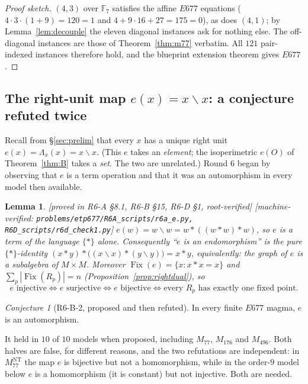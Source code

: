 \documentclass[11pt]{article}
\theoremstyle{plain}
\newtheorem{lemma}[theorem]{Lemma}
\theoremstyle{definition}
\theoremstyle{remark}
\newtheorem*{conjecture*}{Conjecture}
\numberwithin{equation}{section}
\newcommand{\F}{\mathbb{F}}
\newcommand{\op}{\mathbin{*}}
\newcommand{\Fix}{\operatorname{Fix}}
\newcommand{\statusbox}[1]{{\small\sloppy\textsf{[#1]}}}
\newcommand{\MV}[1]{\statusbox{machine-verified: \texttt{#1}}}
\newcommand{\PROVED}[1]{\statusbox{proved in #1, root-verified}}
\begin{document}
\begin{proof}[Proof sketch]
$(4,3)$ over $\F_7$ satisfies the affine $E677$ equations
($4\cdot3\cdot(1+9) = 120 = 1$ and $4+9\cdot16+27 = 175 = 0$), as does $(4,1)$; by
Lemma~\ref{lem:decouple} the eleven diagonal instances ask for nothing else. The
off-diagonal instances are those of Theorem~\ref{thm:m77} verbatim. All $121$
pair-indexed instances therefore hold, and the blueprint extension theorem gives
$E677$.
\end{proof}

\subsection{The right-unit map $e(x) = x\backslash x$: a conjecture refuted
twice}\label{sec:emap}

Recall from \S\ref{sec:prelim} that every $x$ has a unique right unit
$e(x) = \Lambda_x(x) = x\backslash x$. (This $e$ takes an \emph{element}; the
isoperimetric $e(O)$ of Theorem~\ref{thm:B} takes a \emph{set}. The two are
unrelated.) Round 6 began by observing that $e$ is a term operation and that it
was an automorphism in every model then available.

\begin{lemma}\label{lem:eterm}
\PROVED{R6-A \S8.1, R6-B \S15, R6-D \S1}\;%
\MV{problems\slash etp677\slash R6A\_scripts\slash r6a\_e.py, R6D\_scripts\slash r6d\_check1.py}
$e(w) = w\backslash w = w\op((w\op w)\op w)$, so $e$ is a term of the language
$\{\op\}$ alone. Consequently ``$e$ is an endomorphism'' is the pure
$\{\op\}$-identity $(x\op y)\op\bigl((x\backslash x)\op(y\backslash y)\bigr) = x\op y$,
equivalently: \emph{the graph of $e$ is a subalgebra of $M\times M$}. Moreover
$\Fix(e) = \{x : x\op x = x\}$ and $\sum_p|\Fix(R_p)| = n$
(Proposition~\ref{prop:rightdual}), so
\[
  e \text{ injective} \iff e \text{ surjective} \iff e \text{ bijective}
  \iff \text{every } R_p \text{ has exactly one fixed point.}
\]
\end{lemma}

\begin{conjecture*}[R6-B-2, proposed and then refuted]
In every finite $E677$ magma, $e$ is an automorphism.
\end{conjecture*}

It held in $10$ of $10$ models when proposed, including $M_{77}$, $M_{176}$ and
$M_{496}$. Both halves are false, for different reasons, and the two refutations
are independent: in $M_{77}^{\mathrm{NT}}$ the map $e$ is bijective but not a
homomorphism, while in the order-$9$ model below $e$ is a homomorphism (it is
constant) but not injective. Both are needed.
\end{document}
